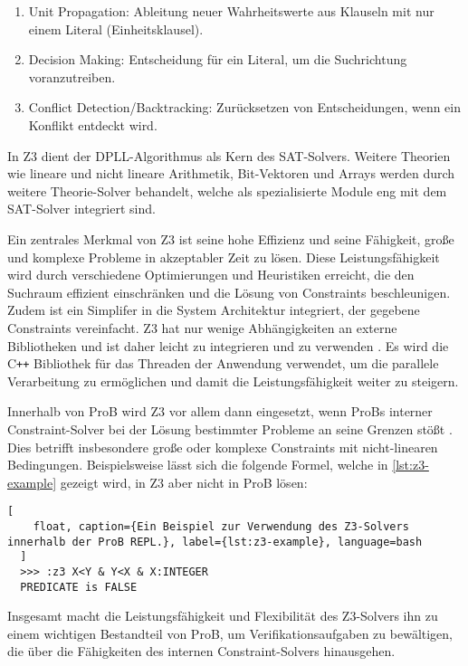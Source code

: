 \begin{enumerate}
    \item Unit Propagation: Ableitung neuer Wahrheitswerte aus Klauseln mit nur einem Literal (Einheitsklausel).
    \item Decision Making: Entscheidung für ein Literal, um die Suchrichtung voranzutreiben.
    \item Conflict Detection/Backtracking: Zurücksetzen von Entscheidungen, wenn ein Konflikt entdeckt wird.
\end{enumerate}    

In Z3 dient der DPLL-Algorithmus als Kern des SAT-Solvers.
Weitere Theorien wie lineare und nicht lineare Arithmetik, Bit-Vektoren und Arrays werden durch weitere Theorie-Solver behandelt,
welche als spezialisierte Module eng mit dem SAT-Solver integriert sind.

Ein zentrales Merkmal von Z3 ist seine hohe Effizienz und seine Fähigkeit,
große und komplexe Probleme in akzeptabler Zeit zu lösen.
Diese Leistungsfähigkeit wird durch verschiedene Optimierungen und Heuristiken erreicht,
die den Suchraum effizient einschränken und die Lösung von Constraints beschleunigen.
Zudem ist ein Simplifer in die System Architektur integriert, der gegebene Constraints vereinfacht.
Z3 hat nur wenige Abhängigkeiten an externe Bibliotheken und ist daher leicht zu integrieren und zu verwenden \cite{z3prover-github}.
Es wird die C\texttt{++} Bibliothek für das Threaden der Anwendung verwendet, um die parallele Verarbeitung zu ermöglichen und damit die Leistungsfähigkeit weiter zu steigern. 

Innerhalb von ProB wird Z3 vor allem dann eingesetzt, wenn ProBs interner Constraint-Solver bei der Lösung bestimmter Probleme an seine Grenzen stößt \cite{10.1007/978-3-319-33693-0_23}.
Dies betrifft insbesondere große oder komplexe Constraints mit nicht-linearen Bedingungen.
Beispielsweise lässt sich die folgende Formel, welche in \cref{lst:z3-example} gezeigt wird, in Z3 aber nicht in ProB lösen:

\begin{lstlisting}[
    float, caption={Ein Beispiel zur Verwendung des Z3-Solvers innerhalb der ProB REPL.}, label={lst:z3-example}, language=bash
  ]
  >>> :z3 X<Y & Y<X & X:INTEGER
  PREDICATE is FALSE
\end{lstlisting}
\FloatBarrier


Insgesamt macht die Leistungsfähigkeit und Flexibilität des Z3-Solvers ihn zu einem wichtigen Bestandteil von ProB,
um Verifikationsaufgaben zu bewältigen, die über die Fähigkeiten des internen Constraint-Solvers hinausgehen.



